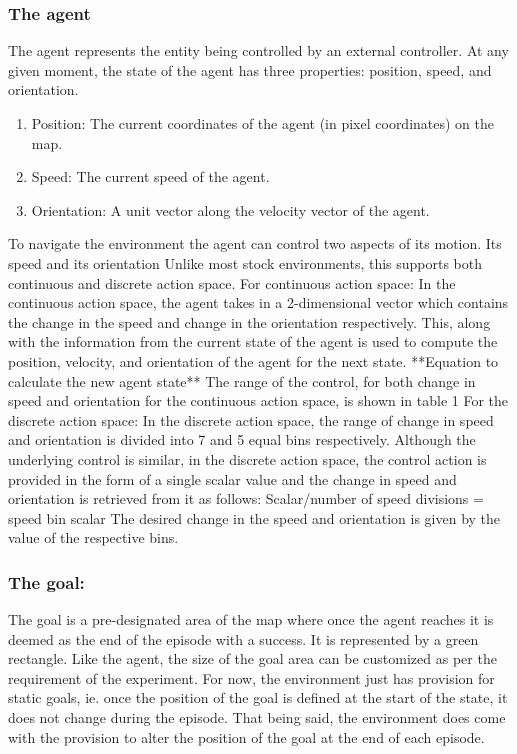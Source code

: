 \subsubsection*{The agent}
The agent represents the entity being controlled by an external controller. At any given moment, the state of the agent has three properties: position, speed, and orientation.
\begin{enumerate}
	\item Position: The current coordinates of the agent (in pixel coordinates) on the map.
	\item Speed: The current speed of the agent.
	\item Orientation: A unit vector along the velocity vector of the agent.
\end{enumerate}
To navigate the environment the agent can control two aspects of its motion. Its speed and its orientation
Unlike most stock environments, this supports both continuous and discrete action space. 
For continuous action space:
In the continuous action space, the agent takes in a 2-dimensional vector which contains the change in the speed and change in the orientation respectively. This, along with the information from the current state of the agent is used to compute the position, velocity, and orientation of the agent for the next state.
**Equation to calculate the new agent state**
The range of the control, for both change in speed and orientation for the continuous action space, is shown in table 1
For the discrete action space:
In the discrete action space, the range of change in speed and orientation is divided into 7 and 5 equal bins respectively. 
Although the underlying control is similar, in the discrete action space, the control action is provided in the form of  a single scalar value and the change in speed and orientation is retrieved from it as follows:
Scalar/number of speed divisions = speed bin
scalar%
The desired change in the speed and orientation is given by the value of the respective bins. 

\subsubsection*{The goal:}
The goal is a pre-designated area of the map where once the agent reaches it is deemed as the end of the episode with a success. It is represented by a green rectangle. Like the agent, the size of the goal area can be customized as per the requirement of the experiment. For now, the environment just has provision for static goals, ie. once the position of the goal is defined at the start of the state, it does not change during the episode. That being said, the environment does come with the provision to alter the position of the goal at the end of each episode.


